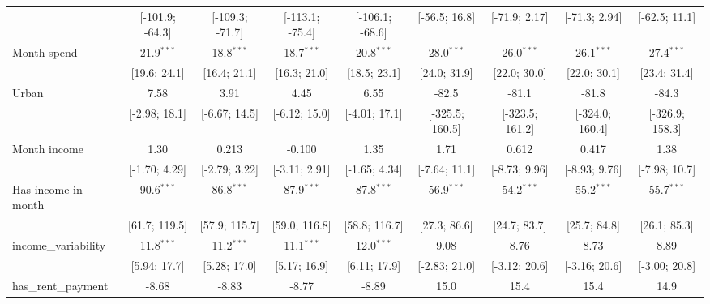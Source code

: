 \begin{table}[htbp]
\begin{threeparttable}[b]
\begin{tabular}{lcccccccc}
                                   & [-101.9; -64.3] & [-109.3; -71.7] & [-113.1; -75.4] & [-106.1; -68.6] & [-56.5; 16.8]   & [-71.9; 2.17]   & [-71.3; 2.94]   & [-62.5; 11.1]\\   
         Month spend               & 21.9$^{***}$    & 18.8$^{***}$    & 18.7$^{***}$    & 20.8$^{***}$    & 28.0$^{***}$    & 26.0$^{***}$    & 26.1$^{***}$    & 27.4$^{***}$\\   
                                   & [19.6; 24.1]    & [16.4; 21.1]    & [16.3; 21.0]    & [18.5; 23.1]    & [24.0; 31.9]    & [22.0; 30.0]    & [22.0; 30.1]    & [23.4; 31.4]\\   
         Urban                     & 7.58            & 3.91            & 4.45            & 6.55            & -82.5           & -81.1           & -81.8           & -84.3\\   
                                   & [-2.98; 18.1]   & [-6.67; 14.5]   & [-6.12; 15.0]   & [-4.01; 17.1]   & [-325.5; 160.5] & [-323.5; 161.2] & [-324.0; 160.4] & [-326.9; 158.3]\\   
         Month income              & 1.30            & 0.213           & -0.100          & 1.35            & 1.71            & 0.612           & 0.417           & 1.38\\   
                                   & [-1.70; 4.29]   & [-2.79; 3.22]   & [-3.11; 2.91]   & [-1.65; 4.34]   & [-7.64; 11.1]   & [-8.73; 9.96]   & [-8.93; 9.76]   & [-7.98; 10.7]\\   
         Has income in month       & 90.6$^{***}$    & 86.8$^{***}$    & 87.9$^{***}$    & 87.8$^{***}$    & 56.9$^{***}$    & 54.2$^{***}$    & 55.2$^{***}$    & 55.7$^{***}$\\   
                                   & [61.7; 119.5]   & [57.9; 115.7]   & [59.0; 116.8]   & [58.8; 116.7]   & [27.3; 86.6]    & [24.7; 83.7]    & [25.7; 84.8]    & [26.1; 85.3]\\   
         income\_variability       & 11.8$^{***}$    & 11.2$^{***}$    & 11.1$^{***}$    & 12.0$^{***}$    & 9.08            & 8.76            & 8.73            & 8.89\\   
                                   & [5.94; 17.7]    & [5.28; 17.0]    & [5.17; 16.9]    & [6.11; 17.9]    & [-2.83; 21.0]   & [-3.12; 20.6]   & [-3.16; 20.6]   & [-3.00; 20.8]\\   
         has\_rent\_payment        & -8.68           & -8.83           & -8.77           & -8.89           & 15.0            & 15.4            & 15.4            & 14.9\\   

\end{tabular}
\end{threeparttable}
\end{table}
